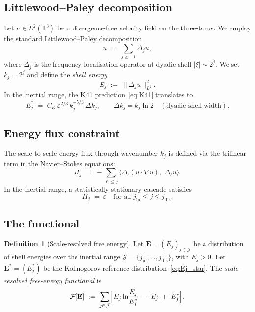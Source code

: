 \documentclass[12pt,a4paper]{article}
\theoremstyle{definition}
\newtheorem{definition}{Definition}[section]
\theoremstyle{plain}
\theoremstyle{remark}
\begin{document}
\subsection{Littlewood--Paley decomposition}

Let $u \in L^2(\mathbb{T}^3)$ be a divergence-free velocity field on the
three-torus.  We employ the standard Littlewood--Paley decomposition
\begin{equation}\label{eq:LP}
  u \;=\; \sum_{j \ge -1} \Delta_j u,
\end{equation}
where $\Delta_j$ is the frequency-localisation operator at dyadic shell
$|\xi| \sim 2^j$.  We set $k_j = 2^j$ and define the \emph{shell energy}
\begin{equation}\label{eq:Ej}
  E_j \;:=\; \|\Delta_j u\|_{L^2}^2.
\end{equation}
In the inertial range, the K41 prediction~\eqref{eq:K41} translates to
\begin{equation}\label{eq:Ej_star}
  E_j^* \;=\; C_K\, \varepsilon^{2/3}\, k_j^{-5/3} \,\Delta k_j,
  \qquad \Delta k_j = k_j \ln 2 \quad (\text{dyadic shell width}).
\end{equation}

\subsection{Energy flux constraint}

The scale-to-scale energy flux through wavenumber $k_j$ is defined via the
trilinear term in the Navier--Stokes equations:
\begin{equation}\label{eq:flux}
  \Pi_j \;=\; -\sum_{\ell \le j}
    \langle \Delta_\ell(u \cdot \nabla u),\; \Delta_\ell u \rangle.
\end{equation}
In the inertial range, a statistically stationary cascade satisfies
\begin{equation}\label{eq:const_flux}
  \Pi_j \;=\; \varepsilon \quad \text{for all } j_{\mathrm{in}} \le j \le j_{\mathrm{dis}}.
\end{equation}

\subsection{The functional}

\begin{definition}[Scale-resolved free energy]\label{def:F}
Let $\mathbf{E} = (E_j)_{j \in \mathcal{J}}$ be a distribution of shell
energies over the inertial range $\mathcal{J} = \{j_{\mathrm{in}}, \dots,
j_{\mathrm{dis}}\}$, with $E_j > 0$.  Let $\mathbf{E}^* = (E_j^*)$ be
the Kolmogorov reference distribution~\eqref{eq:Ej_star}.  The
\emph{scale-resolved free-energy functional} is
\begin{equation}\label{eq:F}
  \mathcal{F}[\mathbf{E}]
  \;:=\;
  \sum_{j \in \mathcal{J}}
  \Bigl[
    E_j \ln\!\frac{E_j}{E_j^*} \;-\; E_j \;+\; E_j^*
  \Bigr].
\end{equation}
\end{definition}
\end{document}
